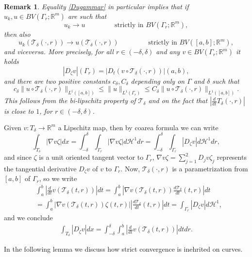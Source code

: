 \documentclass[a4paper,11pt]{article}
\numberwithin{equation}{section}
\newtheorem{remark}[theorem]{Remark}
\newcommand{\R}{\mathbb{R}}
\begin{document}
\begin{remark}\label{rem_stricttraces}
Equality \eqref{Dugammar} in particular implies that 
if $u_k,u\in BV(\Gamma_r;\R^m)$ are such that 
$$u_k\rightarrow u\qquad \qquad \text{ strictly in }BV(\Gamma_r;\R^m),$$
then also
$$u_k(\mathcal T_\delta(\cdot,r))\rightarrow u(\mathcal T_\delta(\cdot,r))\qquad \qquad \text{ strictly in }BV([a,b];\R^m),$$
and viceversa. More precisely, for all $r\in(-\delta,\delta)$ and any $v\in BV(\Gamma_r;\R^m)$ it holds
$$|D_\zeta v|(\Gamma_r)=|D_t(v\circ \mathcal T_\delta(\cdot,r))|(a,b),$$
and there are two positive constants $c_\delta,C_\delta$ depending only on $\Gamma$ and $\delta$ such that 
$$c_\delta \|u\circ\mathcal T_\delta(\cdot,r)\|_{L^1([a,b])}\leq \|u\|_{L^1(\Gamma_r)}\leq C_\delta \|u\circ\mathcal T_\delta(\cdot,r)\|_{L^1([a,b])}.$$
This follows from the bi-lipschitz property of $\mathcal T_\delta$ and on the fact that $|\frac{d}{dt} T_\delta(\cdot,r)|$ is close to $1$, for $r\in (-\delta,\delta)$.
\end{remark}
Given $v:T_\delta\rightarrow \R^m$ a Lipschitz map, then by coarea formula we can write
$$\int_{T_\delta}|\nabla v\zeta|dx=\int_{-\delta}^\delta\int_{\Gamma_r}|\nabla v\zeta|d\mathcal H^1dr=\int_{-\delta}^\delta\int_{\Gamma_r}|D_\zeta v|d\mathcal H^1dr,$$
and since $\zeta$ is a unit oriented tangent vector to $\Gamma_r$, $\nabla v\zeta=\sum_{j=1}^2D_jv\zeta_j$ represents the tangential derivative $D_\zeta v$ of $v$ to $\Gamma_r$. Now, $\mathcal T_\delta(\cdot,r)$ is a parametrization from $[a,b]$ of $\Gamma_r$, so we write
\begin{align}
&\int_{a}^b|\frac{d}{dt}v(\mathcal T_\delta(t,r))|dt=\int_a^b|\nabla v(\mathcal T_\delta(t,r))\frac{d\mathcal T_\delta}{dt}(t,r)|dt\nonumber\\
&=\int_a^b|\nabla v(\mathcal T_\delta(t,r))\zeta(t,r)||\frac{d\mathcal T_\delta}{dt}(t,r)|dt=\int_{\Gamma_r}|D_\zeta v|d\mathcal H^1,
\end{align}
and we conclude
\begin{align}
\int_{T_\delta}|D_\zeta v|dx=\int_{-\delta}^\delta\int_{a}^b|\frac{d}{dt}v(\mathcal T_\delta(t,r))|dtdr.
\end{align}

In the following lemma we discuss how strict convergence is inehrited on curves. 
\end{document}
